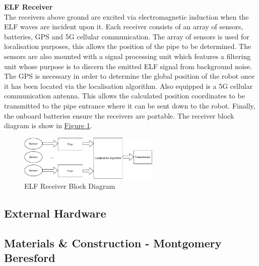 \documentclass[11pt]{article}		%
\newcommand{\figref}[1]{\hyperref[#1]{Figure \ref*{#1}}}    %
\begin{document}
			\textbf{ELF Receiver}\\
			The receivers above ground are excited via electromagnetic induction when the ELF waves are incident upon it. Each receiver consists of an array of sensors, batteries, GPS and 5G cellular communication. The array of sensors is used for localisation purposes, this allows the position of the pipe to be determined. The sensors are also mounted with a signal processing unit which features a filtering unit whose purpose is to discern the emitted ELF signal from background noise. The GPS is necessary in order to determine the global position of the robot once it has been located via the localisation algorithm. Also equipped is a 5G cellular communication antenna. This allows the calculated position coordinates to be transmitted to the pipe entrance where it can be sent down to the robot.  Finally, the onboard batteries ensure the receivers are portable. The receiver block diagram is show in \figref{ELFrec}.
		    
		    \begin{figure}[h]
				\centering
				\includegraphics[width=0.6\textwidth]{blockreceiever}
				\caption{ELF Receiver Block Diagram}
				\label{ELFrec}
			\end{figure}
	
		\subsection{External Hardware}
		
		
	
		\subsection[Materials \& Construction]{Materials \& Construction - Montgomery Beresford}
		
\end{document}
